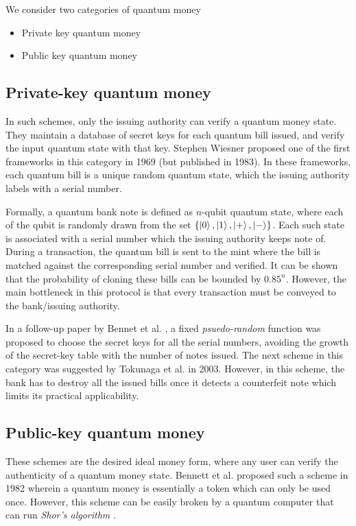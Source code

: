\documentclass[]{article}
\begin{document}
We consider two categories of quantum money
\begin{itemize}
    \item Private key quantum money
    \item Public key quantum money
\end{itemize}

\subsection{Private-key quantum money}

In such schemes, only the issuing authority can verify a quantum money state. They maintain a database of secret keys for each quantum bill issued, and verify the input quantum state with that key. Stephen Wiesner proposed one of the first frameworks in this category in 1969 \cite{Wiesner} (but published in 1983). In these frameworks, each quantum bill is a unique random quantum state, which the issuing authority labels with a serial number. 

Formally, a quantum bank note is defined as $n$-qubit quantum state, where each of the qubit is randomly drawn from the set $\{ \ket{0}, \ket{1}, \ket{+}, \ket{-}\}$. Each such state is associated with a serial number which the issuing authority keeps note of. During a transaction, the quantum bill is sent to the mint where the bill is matched against the corresponding serial number and verified. It can be shown that the probability of cloning these bills can be bounded by $0.85^n$. However, the main bottleneck in this protocol is that every transaction must be conveyed to the bank/issuing authority.

In a follow-up paper by Bennet et al. \cite{Bennett1982QuantumCO}, a fixed \textit{psuedo-random} function was proposed to choose the secret keys for all the serial numbers, avoiding the growth of the secret-key table with the number of notes issued. The next scheme in this category was suggested by Tokunaga et al. in 2003. However, in this scheme, the bank has to destroy all the issued bills once it detects a counterfeit note which limits its practical applicability.

\subsection{Public-key quantum money}
These schemes are the desired ideal money form, where any user can verify the authenticity of a quantum money state. Bennett et al. proposed such a scheme in 1982 \cite{Bennett1982QuantumCO} wherein a quantum money is essentially a token which can only be used once. However, this scheme can be easily broken by a quantum computer that can run \textit{Shor's algorithm} \cite{Shor1995PolynomialTimeAF}. 
\end{document}
